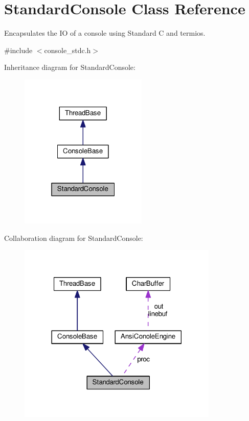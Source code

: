 \hypertarget{classStandardConsole}{}\section{Standard\+Console Class Reference}
\label{classStandardConsole}


Encapsulates the IO of a console using Standard C and termios.  




{\ttfamily \#include $<$console\+\_\+stdc.\+h$>$}



Inheritance diagram for Standard\+Console\+:\nopagebreak
\begin{figure}[H]
\begin{center}
\leavevmode
\includegraphics[width=172pt]{classStandardConsole__inherit__graph}
\end{center}
\end{figure}


Collaboration diagram for Standard\+Console\+:\nopagebreak
\begin{figure}[H]
\begin{center}
\leavevmode
\includegraphics[width=270pt]{classStandardConsole__coll__graph}
\end{center}
\end{figure}
